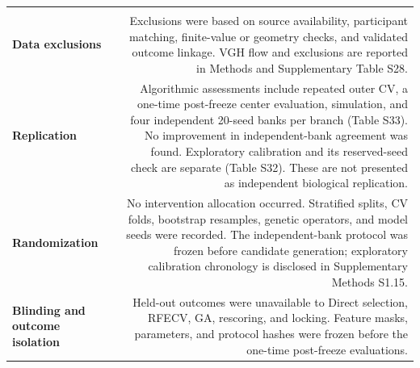 \documentclass[10pt,letterpaper]{article}
\newcommand{\sectionrow}[1]{%
  \rowcolor{BandGray}\multicolumn{2}{l}{\sffamily\bfseries\color{TextGray}#1}\\[1pt]
}
\newcommand{\topic}[1]{\sffamily\bfseries\color{TextGray}#1}
\begin{document}
\begin{longtable}{@{}LR@{}}
\sectionrow{Study design}
\topic{Data exclusions} & Exclusions were based on source availability, participant matching, finite-value or geometry checks, and validated outcome linkage. VGH flow and exclusions are reported in Methods and Supplementary Table S28.\\
\topic{Replication} & Algorithmic assessments include repeated outer CV, a one-time post-freeze center evaluation, simulation, and four independent 20-seed banks per branch (Table S33). No improvement in independent-bank agreement was found. Exploratory calibration and its reserved-seed check are separate (Table S32). These are not presented as independent biological replication.\\
\topic{Randomization} & No intervention allocation occurred. Stratified splits, CV folds, bootstrap resamples, genetic operators, and model seeds were recorded. The independent-bank protocol was frozen before candidate generation; exploratory calibration chronology is disclosed in Supplementary Methods S1.15.\\
\topic{Blinding and outcome isolation} & Held-out outcomes were unavailable to Direct selection, RFECV, GA, rescoring, and locking. Feature masks, parameters, and protocol hashes were frozen before the one-time post-freeze evaluations.\\
\bottomrule
\end{longtable}
\end{document}
